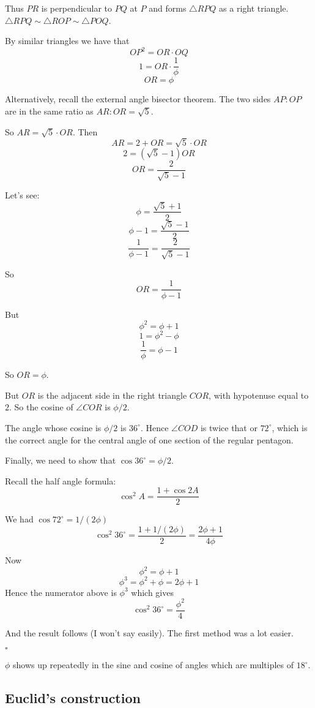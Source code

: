 \documentclass[11pt, oneside]{article}
\begin{document}
Thus $PR$ is perpendicular to $PQ$ at $P$ and forms $\triangle RPQ$ as a right triangle.  $\triangle RPQ \sim \triangle ROP \sim \triangle POQ$.

By similar triangles we have that 
\[ OP^2 = OR \cdot OQ \]
\[ 1 = OR \cdot \frac{1}{\phi} \]
\[ OR = \phi \]

Alternatively, recall the external angle bisector theorem.  The two sides $AP:OP$ are in the same ratio as $AR:OR = \sqrt{5}$.

So $AR = \sqrt{5} \cdot OR$.  Then
\[ AR = 2 + OR = \sqrt{5} \cdot OR \]
\[ 2 = (\sqrt{5} - 1) OR \]
\[ OR = \frac{2}{\sqrt{5} - 1} \]

Let's see:
\[ \phi = \frac{\sqrt{5} + 1}{2} \]
\[ \phi - 1 = \frac{\sqrt{5} - 1}{2} \]
\[ \frac{1}{\phi - 1} = \frac{2}{\sqrt{5} - 1} \]

So
\[ OR = \frac{1}{\phi - 1} \]

But
\[ \phi^2 = \phi + 1 \]
\[ 1 = \phi^2 - \phi  \]
\[ \frac{1}{\phi} = \phi - 1 \]

So $OR = \phi$.

But $OR$ is the adjacent side in the right triangle $COR$, with hypotenuse equal to $2$.  So the cosine of $\angle COR$ is $\phi/2$.

The angle whose cosine is $\phi/2$ is $36^{\circ}$.  Hence $\angle COD$ is twice that or $72^{\circ}$, which is the correct angle for the central angle of one section of the regular pentagon.

Finally, we need to show that $\cos 36^{\circ} = \phi/2$.

Recall the half angle formula:
\[ \cos^2 A = \frac{1 + \cos 2A}{2} \]

We had $\cos 72^{\circ} = 1/(2 \phi)$
\[ \cos^2 36^{\circ} = \frac{1 + 1/(2 \phi)}{2} = \frac{2 \phi + 1}{4 \phi} \]

Now
\[ \phi^2 = \phi + 1 \]
\[ \phi^3 = \phi^2 + \phi = 2 \phi + 1 \]
Hence the numerator above is $\phi^3$ which gives
\[ \cos^2 36^{\circ} = \frac{\phi^2}{4} \]

And the result follows (I won't say easily).  The first method was a lot easier.

$\square$

$\phi$ shows up repeatedly in the sine and cosine of angles which are multiples of $18^{\circ}$.

\subsection*{Euclid's construction}
\end{document}
